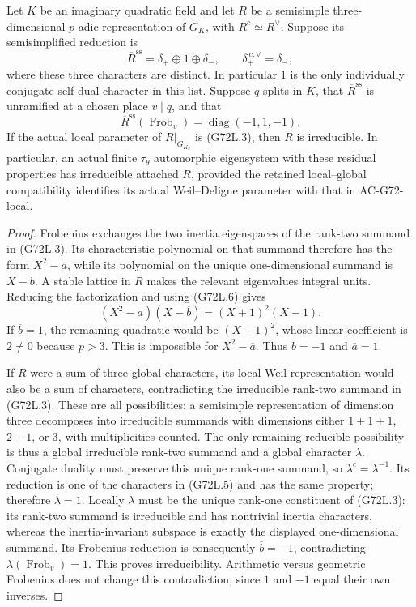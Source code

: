 \begin{corollary}
\label{AC-G72-stable}
Let $K$ be an imaginary quadratic field and let $R$ be a
semisimple three-dimensional $p$-adic representation of
$G_K$, with $R^c\simeq R^\vee$.  Suppose its semisimplified
reduction is
\[
       \overline R^{\mathrm{ss}}
           =\delta_+\oplus1\oplus\delta_-,\qquad
       \delta_+^{\,c,\vee}=\delta_-,                         \tag{G72L.5}
\]
where these three characters are distinct.  In particular
$1$ is the only individually conjugate-self-dual character
in this list.  Suppose $q$ splits in $K$, that
$\overline R^{\mathrm{ss}}$ is unramified at a chosen
place $v\mid q$, and that
\[
       \overline R^{\mathrm{ss}}(\operatorname{Frob}_v)
                    =\operatorname{diag}(-1,1,-1).          \tag{G72L.6}
\]
If the actual local parameter of $R|_{G_{K_v}}$ is (G72L.3),
then $R$ is irreducible.  In particular, an actual finite
$\tau_\theta$ automorphic eigensystem with these residual
properties has irreducible attached $R$, provided the
retained local--global compatibility identifies its actual
Weil--Deligne parameter with that in AC-G72-local.
\end{corollary}
\begin{proof}
Frobenius exchanges the two inertia eigenspaces of the
rank-two summand in (G72L.3).  Its characteristic polynomial
on that summand therefore has the form $X^2-a$, while its
polynomial on the unique one-dimensional summand is $X-b$.
A stable lattice in $R$ makes the relevant eigenvalues
integral units.  Reducing the factorization and using
(G72L.6) gives
\[
              (X^2-\overline a)(X-\overline b)
                         =(X+1)^2(X-1).                    \tag{G72L.7}
\]
If $\overline b=1$, the remaining quadratic would be
$(X+1)^2$, whose linear coefficient is $2\ne0$ because
$p>3$.  This is impossible for $X^2-\overline a$.
Thus $\overline b=-1$ and $\overline a=1$.

If $R$ were a sum of three global characters, its local
Weil representation would also be a sum of characters,
contradicting the irreducible rank-two summand in (G72L.3).
These are all possibilities: a semisimple representation of
dimension three decomposes into irreducible summands with
dimensions either $1+1+1$, $2+1$, or $3$, with multiplicities
counted.  The only remaining reducible possibility is thus a
global irreducible rank-two summand and a global character
$\lambda$.
Conjugate duality must preserve this unique rank-one
summand, so $\lambda^c=\lambda^{-1}$.  Its reduction is one
of the characters in (G72L.5) and has the same property;
therefore $\overline\lambda=1$.  Locally $\lambda$ must be
the unique rank-one constituent of (G72L.3): its rank-two
summand is irreducible and has nontrivial inertia characters,
whereas the inertia-invariant subspace is exactly the displayed
one-dimensional summand.  Its Frobenius
reduction is consequently $\overline b=-1$, contradicting
$\overline\lambda(\operatorname{Frob}_v)=1$.  This proves
irreducibility.  Arithmetic versus geometric Frobenius does
not change this contradiction, since $1$ and $-1$ equal
their own inverses.
\end{proof}

